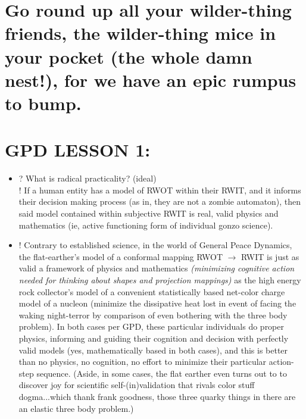 \documentclass{article}
\begin{document}
\section*{{\large Go round up all your wilder-thing friends, the wilder-thing mice in your pocket (the whole damn nest!), for we have an epic rumpus to bump.}}

\section*{GPD LESSON 1:}
\begin{itemize}
\item[]{? What is radical practicality? (ideal)\\
! If a human entity has a model of RWOT within their RWIT, and it informs their decision making process (as in, they are not a zombie automaton), then said model contained within subjective RWIT is real, valid physics and mathematics (ie, active functioning form of individual gonzo science).}
\item[]{! Contrary to established science, in the world of General Peace Dynamics, the flat-earther's model of a conformal mapping RWOT $\rightarrow$ RWIT is just as valid a framework of physics and mathematics {\em (minimizing cognitive action needed for thinking about shapes and projection mappings)} as the high energy rock collector's model of a convenient statistically based net-color charge model of a nucleon (minimize the dissipative heat lost in event of facing the waking night-terror by comparison of even bothering with the three body problem). In both cases per GPD, these particular individuals do proper physics, informing and guiding their cognition and decision with perfectly valid models (yes, mathematically based in both cases), and this is better than no physics, no cognition, no effort to minimize their particular action-step sequence. (Aside, in some cases, the flat earther even turns out to to discover joy for scientific self-(in)validation that rivals color stuff dogma...which thank frank goodness, those three quarky things in there are an elastic three body problem.)}

\end{itemize}
\end{document}

